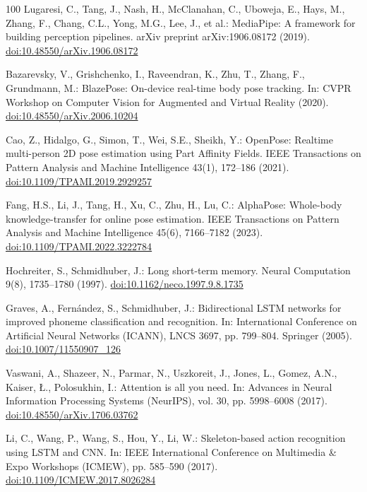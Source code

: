 \documentclass[runningheads]{llncs}
\begin{document}
\begin{thebibliography}{100}
Lugaresi, C., Tang, J., Nash, H., McClanahan, C., Uboweja, E., Hays, M., Zhang, F., Chang, C.L., Yong, M.G., Lee, J., et al.: MediaPipe: A framework for building perception pipelines. arXiv preprint arXiv:1906.08172 (2019). \href{https://doi.org/10.48550/arXiv.1906.08172}{doi:10.48550/arXiv.1906.08172}

Bazarevsky, V., Grishchenko, I., Raveendran, K., Zhu, T., Zhang, F., Grundmann, M.: BlazePose: On-device real-time body pose tracking. In: CVPR Workshop on Computer Vision for Augmented and Virtual Reality (2020). \href{https://doi.org/10.48550/arXiv.2006.10204}{doi:10.48550/arXiv.2006.10204}

Cao, Z., Hidalgo, G., Simon, T., Wei, S.E., Sheikh, Y.: OpenPose: Realtime multi-person 2D pose estimation using Part Affinity Fields. IEEE Transactions on Pattern Analysis and Machine Intelligence 43(1), 172--186 (2021). \href{https://doi.org/10.1109/TPAMI.2019.2929257}{doi:10.1109/TPAMI.2019.2929257}

Fang, H.S., Li, J., Tang, H., Xu, C., Zhu, H., Lu, C.: AlphaPose: Whole-body knowledge-transfer for online pose estimation. IEEE Transactions on Pattern Analysis and Machine Intelligence 45(6), 7166--7182 (2023). \href{https://doi.org/10.1109/TPAMI.2022.3222784}{doi:10.1109/TPAMI.2022.3222784}

Hochreiter, S., Schmidhuber, J.: Long short-term memory. Neural Computation 9(8), 1735--1780 (1997). \href{https://doi.org/10.1162/neco.1997.9.8.1735}{doi:10.1162/neco.1997.9.8.1735}

Graves, A., Fern\'{a}ndez, S., Schmidhuber, J.: Bidirectional LSTM networks for improved phoneme classification and recognition. In: International Conference on Artificial Neural Networks (ICANN), LNCS 3697, pp. 799--804. Springer (2005). \href{https://doi.org/10.1007/11550907_126}{doi:10.1007/11550907\_126}

Vaswani, A., Shazeer, N., Parmar, N., Uszkoreit, J., Jones, L., Gomez, A.N., Kaiser, \L., Polosukhin, I.: Attention is all you need. In: Advances in Neural Information Processing Systems (NeurIPS), vol. 30, pp. 5998--6008 (2017). \href{https://doi.org/10.48550/arXiv.1706.03762}{doi:10.48550/arXiv.1706.03762}

Li, C., Wang, P., Wang, S., Hou, Y., Li, W.: Skeleton-based action recognition using LSTM and CNN. In: IEEE International Conference on Multimedia \& Expo Workshops (ICMEW), pp. 585--590 (2017). \href{https://doi.org/10.1109/ICMEW.2017.8026284}{doi:10.1109/ICMEW.2017.8026284}


\end{thebibliography}
\end{document}
